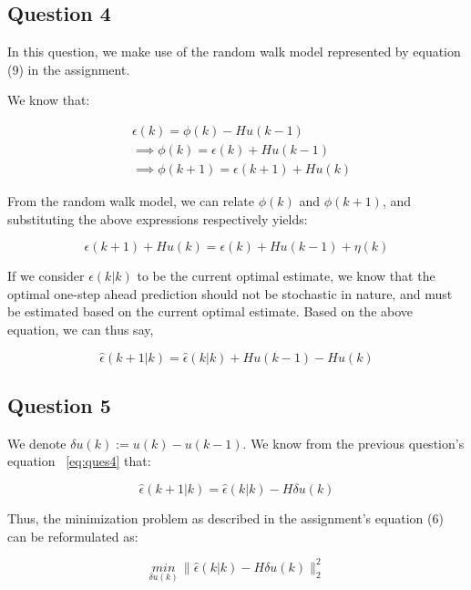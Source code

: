 \documentclass[12pt]{report}
\begin{document}
\subsection*{Question 4}

In this question, we make use of the random walk model represented by equation (9) in the assignment.

We know that:

\begin{equation*}
\begin{aligned}
&\epsilon(k) = \phi(k) - Hu(k-1) \\
&\implies \phi(k) = \epsilon(k) + Hu(k-1) \\
&\implies \phi(k+1) = \epsilon(k+1) + Hu(k)
\end{aligned}
\end{equation*}

From the random walk model, we can relate $\phi(k)$ and $\phi(k+1)$, and substituting the above expressions respectively yields:

\begin{equation*}
\epsilon(k+1) + Hu(k) = \epsilon(k) + Hu(k-1) + \eta(k)
\end{equation*}

If we consider $\hat\epsilon(k|k)$ to be the current optimal estimate, we know that the optimal one-step ahead prediction should not be stochastic in nature, and must be estimated based on the current optimal estimate. Based on the above equation, we can thus say,

\begin{equation}\label{eq:ques4}
\hat\epsilon(k+1|k) = \hat\epsilon(k|k) + Hu(k-1) - Hu(k)
\end{equation}

\subsection*{Question 5}

We denote $\delta u(k) := u(k) - u(k-1)$. We know from the previous question's equation ~\ref{eq:ques4} that:

\begin{equation*}
\hat\epsilon(k+1|k) = \hat\epsilon(k|k) - H\delta u(k)
\end{equation*}

Thus, the minimization problem as described in the assignment's equation (6) can be reformulated as:

\begin{equation*}
	\underset{\delta u(k)}{min} \, \|\hat\epsilon(k|k) - H\delta u(k)\|_{2}^{2}
\end{equation*}
\end{document}
